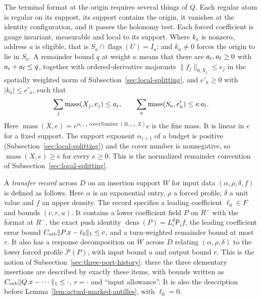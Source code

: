 The terminal format at the origin requires several things of $Q$. Each
regular atom is regular on its support, its support contains the
origin, it vanishes at the identity configuration, and it passes the
holonomy test. Each forced coefficient is gauge invariant, measurable
and local to its support. Where $k_a$ is nonzero, address $a$ is
eligible, that is $S_a\cap\operatorname{flags}(U)=I_a$; and $k_a\ne0$
forces the origin to lie in $S_a$. A remainder bound $q$ at weight
$\kappa$ means that there are $a_{\rm r},a_{\rm f}\ge0$ with
$a_{\rm r}+a_{\rm f}\le q$, together with ordered-derivative majorants
$\|f_j\|_{0,X_j}\le e_j$ in the spatially weighted norm of
Subsection~\ref{sec:local-splitting}, and $e'_a\ge0$ with $|k_a|\le e'_a$, such that
\[
 \sum_j\operatorname{mass}(X_j,e_j)\le a_{\rm r},\qquad
 \sum_a\operatorname{mass}(S_a,e'_a)\le\kappa\,a_{\rm f}.
\]
Here $\operatorname{mass}(X,e)=e^{\alpha_{i+1}\operatorname{coverNumber}(B_{i+1},X)}e$
is the fine mass. It is linear in $e$ for a fixed support. The support
exponent $\alpha_{i+1}$ of a budget is positive
(Subsection~\ref{sec:local-splitting}) and the cover number is
nonnegative, so $\operatorname{mass}(X,e)\ge e$ for every $e\ge0$. This
is the normalized remainder convention of
Subsection~\ref{sec:local-splitting}.

A \emph{transfer record} across $D$ on an insertion support $W$ for input data
$(\alpha,\rho,\delta,f)$ is defined as follows. Here $\alpha$ is an
exponential entry, $\rho$ a forced profile, $\delta$ a unit value and
$f$ an upper density. The record specifies a leading coefficient $\ell_0\in F$ and bounds
$(c,r,u)$. It contains a lower coefficient field $P$ on $R^-$ with the
format at $R^-$, the exact push identity
$\operatorname{dens}(P)=L_i^d\mathsf P_if$, the leading coefficient error bound
$C_{\rm orb}\|P.x-\ell_0\|_1\le c$, and a turn-weighted remainder
bound at most $r$. It also has a response decomposition on $W$ across $D$
relating $(\alpha,\rho,\delta)$ to the lower forced profile
$\mathcal P(P)$, with input bound $u$ and output bound $r$. This is the
notion of Subsection~\ref{sec:three-port-history}: there the three
elementary insertions are described by exactly these items, with
bounds written as $C_{\rm orb}\|Q.x-\cdots\|_1\le\cdot$,
$r=\cdot$ and ``input allowance''. It is also the description before
Lemma~\ref{lem:actual-marked-antilles}, with $\ell_0=0$.

